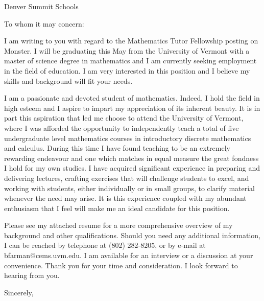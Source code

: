 \documentclass{letter}
\begin{document}
\begin{letter}{Denver Summit Schools}
  \opening{To whom it may concern:}

  I am writing to you with regard to the Mathematics Tutor Fellowship posting on Monster.  
  I will be graduating this May from the University of Vermont with a master of science degree in mathematics and I am currently seeking employment in the field of education.  
  I am very interested in this position and I believe my skills and background will fit your needs.

  I am a passionate and devoted student of mathematics.  
  Indeed, I hold the field in high esteem and I aspire to impart my appreciation of its inherent beauty.  
  It is in part this aspiration that led me choose to attend the University of Vermont, where I was afforded the opportunity to independently teach a total of five undergraduate level mathematics courses in introductory discrete mathematics and calculus.  
  During this time I have found teaching to be an extremely rewarding endeavour and one which matches in equal measure the great fondness I hold for my own studies.  
  I have acquired significant experience in preparing and delivering lectures, crafting exercises that will challenge students to excel, and working with students, either individually or in small groups, to clarify material whenever the need may arise.  
  It is this experience coupled with my abundant enthusiasm that I feel will make me an ideal candidate for this position.

  Please see my attached resume for a more comprehensive overview of my background and other qualifications.  
  Should you need any additional information, I can be reached by telephone at (802) 282-8205, or by e-mail at bfarman@cems.uvm.edu.  
  I am available for an interview or a discussion at your convenience.  
  Thank you for your time and consideration.  
  I look forward to hearing from you.

  \closing{Sincerely,}
\end{letter}
\end{document}
